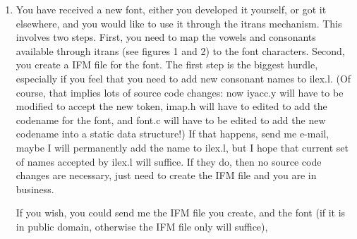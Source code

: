 \documentclass[11pt]{article}
\begin{document}
\begin{enumerate}
\item You have received a new font, either you developed it yourself, or
\renewcommand{\arraystretch}{1.25}
got it elsewhere, and you would like to use it through the itrans
mechanism.
This involves two steps.
First, you need to map the vowels and consonants available through itrans
(see figures 1 and 2) to the font characters.
Second, you create a IFM file for the font.
The first step is the biggest hurdle, especially if you feel that you
need to add new consonant names to ilex.l.
(Of course, that implies lots of source code changes: now iyacc.y will
have to be modified to accept the new token, imap.h will have to edited
to add the codename for the font, and font.c will have to be edited to
add the new codename into a static data structure!)
If that happens, send me e-mail, maybe I will permanently add the name to
ilex.l, but I  hope that current set of names accepted by ilex.l will
suffice.
If they do, then no source code changes are necessary, just need to
create the IFM file and you are in business.

If you wish, you could send me the IFM file you create, and the font
(if it is in public domain, otherwise the IFM file only will suffice),

\end{enumerate}
\end{document}
